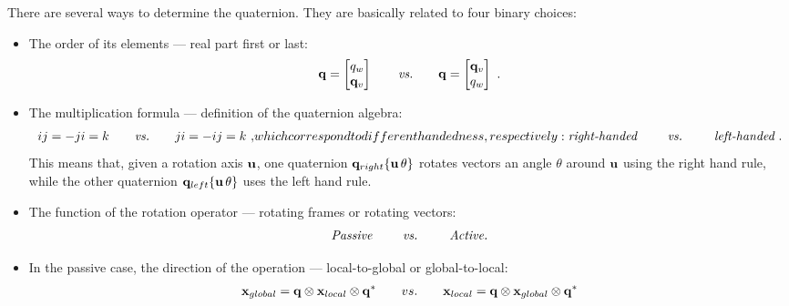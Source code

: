 There are several ways to determine the quaternion. They are basically related to four binary choices:
%
\begin{itemize}
\item
The order of its elements --- real part first or last:
\begin{align}
{\bf q} = \begin{bmatrix}
q_w \\ {\bf q}_v
\end{bmatrix} 
\qquad \textit{vs.} \qquad 
{\bf q} = \begin{bmatrix}
{\bf q}_v \\ q_w
\end{bmatrix}~.
\label{equ:quatOrder}
\end{align}

\item
The multiplication formula --- definition of the quaternion algebra:
%
\begin{subequations}
\label{equ:quatAlg}
\begin{align}
ij=-ji=k 
\qquad \textit{vs.} \qquad 
ji=-ij=k~,
\label{equ:quatAlgDef}
\end{align}
%
which correspond to different handedness, respectively:
%
\begin{align}
\textit{right-handed
\qquad vs. \qquad
left-handed}~.
\label{equ:quatHand}
\end{align}
\end{subequations}
%
This means that, given a rotation axis ${\bf u}$, one quaternion ${\bf q}_{right}\{{\bf u}\,\theta\}$ rotates vectors an angle $\theta$ around ${\bf u}$ using the right hand rule, while the other quaternion ${\bf q}_{left}\{{\bf u}\,\theta\}$ uses the left hand rule.

\item
The function of the rotation operator --- rotating frames or rotating vectors:
%
\begin{align}
\textit{Passive
\qquad vs. \qquad
Active.}
\label{equ:quatAlibi}
\end{align}

\item
In the passive case, the direction of the operation --- local-to-global or global-to-local:
%
\begin{align}
{\bf x}_{global} = {\bf q}\otimes{\bf x}_{local}\otimes{\bf q}^*
\qquad vs. \qquad 
{\bf x}_{local} = {\bf q}\otimes{\bf x}_{global}\otimes{\bf q}^*
\label{equ:quatInterpret}
\end{align}


\end{itemize}

